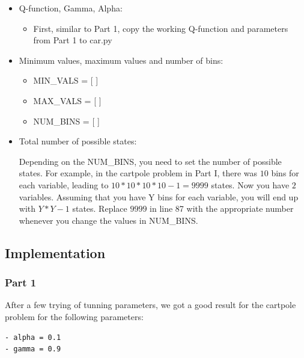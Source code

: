 \documentclass[twoside,10pt]{article}
\begin{document}
\begin{itemize}
    \item
          Q-function, Gamma, Alpha:

          \begin{itemize}
              \item
                    First, similar to Part 1, copy the working Q-function and parameters
                    from Part 1 to car.py
          \end{itemize}
    \item
          Minimum values, maximum values and number of bins:

          \begin{itemize}

              \item
                    MIN\_VALS = {[} {]}
              \item
                    MAX\_VALS = {[} {]}
              \item
                    NUM\_BINS = {[} {]}
          \end{itemize}
    \item
          Total number of possible states:

          Depending on the NUM\_BINS, you need to set the number of possible
          states. For example, in the cartpole problem in Part I, there was
          \(10\) bins for each variable, leading to
          \(10 * 10 * 10 * 10 - 1 = 9999\) states. Now you have \(2\) variables.
          Assuming that you have Y bins for each variable, you will end up with
          \(Y*Y-1\) states. Replace \(9999\) in line 87 with the appropriate
          number whenever you change the values in NUM\_BINS.
\end{itemize}


\subsection*{Implementation}\label{implementation}

\subsubsection*{Part 1}\label{part-1}

After a few trying of tunning parameters, we got a good result for the
cartpole problem for the following parameters:

\begin{verbatim}
- alpha = 0.1
- gamma = 0.9
\end{verbatim}
\end{document}
